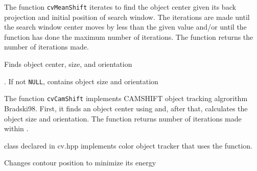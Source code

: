 The function \texttt{cvMeanShift} iterates to find the object center
given its back projection and initial position of search window. The
iterations are made until the search window center moves by less than
the given value and/or until the function has done the maximum number
of iterations. The function returns the number of iterations made.

\label{CamShift}

Finds object center, size, and orientation


\begin{description}
. If not \texttt{NULL}, contains object size and orientation
\end{description}

The function \texttt{cvCamShift} implements CAMSHIFT object tracking algrorithm
Bradski98.
First, it finds an object center using  and, after that, calculates the object size and orientation. The function returns number of iterations made within .

 class declared in cv.hpp implements color object tracker that uses the function.

\label{SnakeImage}

Changes contour position to minimize its energy


